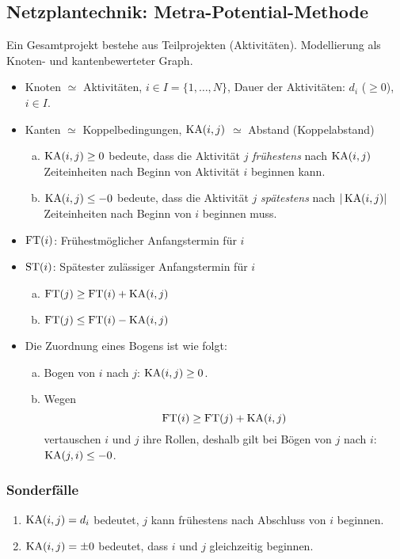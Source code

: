 \subsection{Netzplantechnik: Metra-Potential-Methode}
Ein Gesamtprojekt bestehe aus Teilprojekten (Aktivitäten). Modellierung als
Knoten- und kantenbewerteter Graph.
\begin{itemize}
\item Knoten $\simeq$ Aktivitäten, $i \in I = \{1, \ldots, N \}$, Dauer der
  Aktivitäten: $d_i$ ($\ge 0$), $i \in I$.
\item Kanten $\simeq$ Koppelbedingungen, $\operatorname*{KA}(i,j)$ $\simeq$ Abstand
  (Koppelabstand)
  \begin{enumerate}[a)]
  \item$\operatorname*{KA}(i,j) \ge 0$ bedeute, dass die Aktivität $j$ \emph{frühestens} nach
    $\operatorname*{KA}(i,j)$ Zeiteinheiten nach Beginn von Aktivität $i$ beginnen kann.
  \item $\operatorname*{KA}(i,j) \le - 0$ bedeute, dass die Aktivität $j$ \emph{spätestens}
    nach $|\operatorname*{KA}(i,j)|$ Zeiteinheiten nach Beginn von $i$ beginnen muss.
  \end{enumerate}
\item $\operatorname*{FT}(i)$: Frühestmöglicher Anfangstermin für $i$
\item $\operatorname*{ST}(i)$: Spätester zulässiger Anfangstermin für $i$
  \begin{enumerate}[a)]
  \item $\operatorname*{FT}(j) \ge \operatorname*{FT}(i) + \operatorname*{KA}(i,j)$
  \item $\operatorname*{FT}(j) \le \operatorname*{FT}(i) - \operatorname*{KA}(i,j)$
  \end{enumerate}
\item Die Zuordnung eines Bogens ist wie folgt:
  \begin{enumerate}[a)]
  \item Bogen von $i$ nach $j$: $\operatorname*{KA}(i,j) \ge 0$.
  \item Wegen
    \[ \operatorname*{FT}(i) \ge \operatorname*{FT}(j) + \operatorname*{KA}(i,j) \]
   vertauschen $i$ und $j$ ihre Rollen, deshalb gilt bei Bögen von $j$ nach $i$:
   $\operatorname*{KA}(j,i) \le -0$.
  \end{enumerate}
\end{itemize}

\subsubsection*{Sonderfälle}
\begin{enumerate}
\item $\operatorname*{KA}(i,j) = d_i$ bedeutet, $j$ kann frühestens nach Abschluss von $i$
  beginnen.
\item $\operatorname*{KA}(i,j) = \pm 0$ bedeutet, dass $i$ und $j$ gleichzeitig beginnen.
\end{enumerate}

